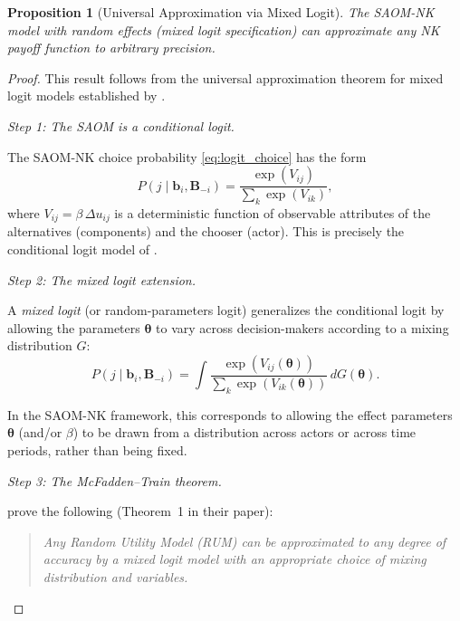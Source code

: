 \documentclass[12pt]{article}
\newtheorem{proposition}{Proposition}
\newcommand{\bb}{\mathbf{b}}
\newcommand{\bB}{\mathbf{B}}
\newcommand{\btheta}{\boldsymbol{\theta}}
\begin{document}
\begin{proposition}[Universal Approximation via Mixed Logit]
\label{prop:mixed_logit}
The SAOM-NK model with random effects (mixed logit specification) can
approximate any NK payoff function to arbitrary precision.
\end{proposition}

\begin{proof}
This result follows from the universal approximation theorem for mixed logit
models established by \citet{mcfadden2000mixed}.

\medskip
\noindent\emph{Step 1: The SAOM is a conditional logit.}

The SAOM-NK choice probability \eqref{eq:logit_choice} has the form
\begin{equation*}
  P(j \mid \bb_i, \bB_{-i}) = \frac{\exp(V_{ij})}{\sum_k \exp(V_{ik})},
\end{equation*}
where $V_{ij} = \beta \, \Delta u_{ij}$ is a deterministic function of
observable attributes of the alternatives (components) and the chooser
(actor). This is precisely the conditional logit model of
\citet{mcfadden1974conditional}.

\medskip
\noindent\emph{Step 2: The mixed logit extension.}

A \emph{mixed logit} (or random-parameters logit) generalizes the conditional
logit by allowing the parameters $\btheta$ to vary across decision-makers
according to a mixing distribution $G$:
\begin{equation}
\label{eq:mixed_logit}
  P(j \mid \bb_i, \bB_{-i}) = \int
    \frac{\exp(V_{ij}(\btheta))}{\sum_k \exp(V_{ik}(\btheta))}
    \, dG(\btheta).
\end{equation}

In the SAOM-NK framework, this corresponds to allowing the effect parameters
$\btheta$ (and/or $\beta$) to be drawn from a distribution across actors
or across time periods, rather than being fixed.

\medskip
\noindent\emph{Step 3: The McFadden--Train theorem.}

\citet{mcfadden2000mixed} prove the following (Theorem~1 in their paper):

\begin{quote}
\emph{Any Random Utility Model (RUM) can be approximated to any degree of
accuracy by a mixed logit model with an appropriate choice of mixing
distribution and variables.}
\end{quote}


\end{proof}
\end{document}
